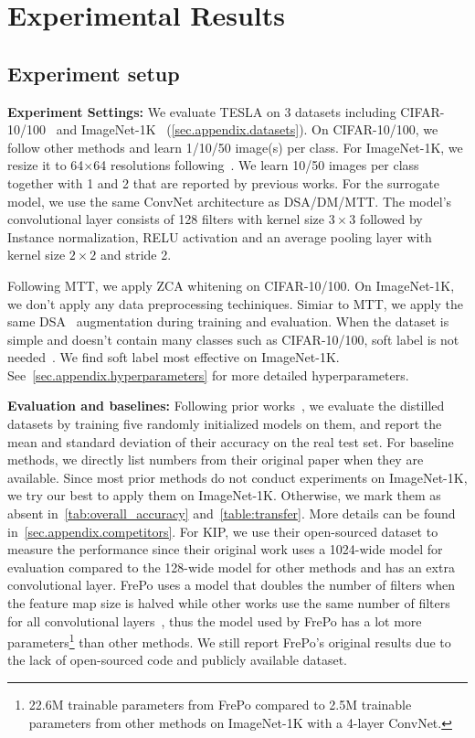 \documentclass[10pt,twocolumn,letterpaper]{article}
\begin{document}
\section{Experimental Results}
\subsection{Experiment setup}
\textbf{Experiment Settings:} We evaluate TESLA on 3 datasets including CIFAR-10/100~\cite{krizhevsky2009learning} and ImageNet-1K~\cite{russakovsky2015imagenet} (\cref{sec.appendix.datasets}). On CIFAR-10/100, we follow other methods and learn 1/10/50 image(s) per class. For ImageNet-1K, we resize it to 64$\times$64 resolutions following~\cite{zhou2022dataset}. We learn 10/50 images per class together with 1 and 2 that are reported by previous works. For the surrogate model, we use the same ConvNet architecture as DSA/DM/MTT. The model's convolutional layer consists of 128 filters with kernel size $3\times 3$ followed by Instance normalization\cite{ulyanov2016instance}, RELU activation and an average pooling layer with kernel size $2\times 2$ and stride 2.

Following MTT, we apply ZCA whitening on CIFAR-10/100. On ImageNet-1K, we don't apply any data preprocessing techiniques. Simiar to MTT, we apply the same DSA~\cite{goodfellow2016deep, radford2015unsupervised, tran2020towards, zhao2020differentiable} augmentation during training and evaluation. When the dataset is simple and doesn't contain many classes such as CIFAR-10/100, soft label is not needed~\cite{zhou2022dataset}. We find soft label most effective on ImageNet-1K. See~\cref{sec.appendix.hyperparameters} for more detailed hyperparameters.

\textbf{Evaluation and baselines:} 
Following prior works~\cite{zhaodsa, zhaodm, cazenavette2022dataset, zhou2022dataset, dcbench}, we evaluate the distilled datasets by training five randomly initialized models on them, and report the mean and standard deviation of their accuracy on the real test set. For baseline methods, we directly list numbers from their original paper when they are available.
Since most prior methods do not conduct experiments on ImageNet-1K, we try our best to apply them on ImageNet-1K. Otherwise, we mark them as absent in~\cref{tab:overall_accuracy} and~\cref{table:transfer}. More details can be found in~\cref{sec.appendix.competitors}. 
For KIP, we use their open-sourced dataset to measure the performance since their original work uses a 1024-wide model for evaluation compared to the 128-wide model for other methods and has an extra convolutional layer. FrePo uses a model that doubles the number of filters when the feature map size is halved while other works use the same number of filters for all convolutional layers~\cite{zhaodsa, zhaodm, cazenavette2022dataset}, thus the model used by FrePo has a lot more parameters\footnote{22.6M  trainable parameters from FrePo compared to 2.5M trainable parameters from other methods on ImageNet-1K with a 4-layer ConvNet. } than other methods. We still report FrePo's original results due to the lack of open-sourced code and publicly available dataset. 
\end{document}
